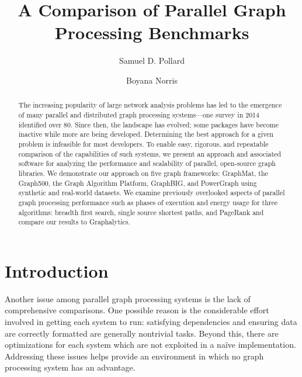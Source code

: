 \documentclass{llncs}
\begin{document}
\title{A Comparison of Parallel Graph Processing Benchmarks}
\author{Samuel D. Pollard \and Boyana Norris}
\maketitle
\begin{abstract}
The increasing popularity of large network analysis problems has led to the emergence of many parallel and distributed graph processing systems---one survey in 2014 identified over 80. Since then, the landscape has evolved; some packages have become inactive while more are being developed. Determining the best approach for a given problem is infeasible for most developers. To enable easy, rigorous, and repeatable comparison of the capabilities of such systems, we present an approach and associated software for analyzing the performance and scalability of parallel, open-source graph libraries. We demonstrate our approach on five graph frameworks: GraphMat, the Graph500, the Graph Algorithm Platform, GraphBIG, and PowerGraph using synthetic and real-world datasets. We examine previously overlooked aspects of parallel graph processing performance such as phases of execution and energy usage for three algorithms: breadth first search, single source shortest paths, and PageRank and compare our results to Graphalytics.
\end{abstract}

\section{Introduction}


Another issue among parallel graph processing systems is the lack of comprehensive comparisons. One possible reason is the considerable effort involved in getting each system to run: satisfying dependencies and ensuring data are correctly formatted are generally nontrivial tasks. Beyond this, there are optimizations for each system which are not exploited in a na\"ive implementation. Addressing these issues helps provide an environment in which no graph processing system has an advantage.


\end{document}
